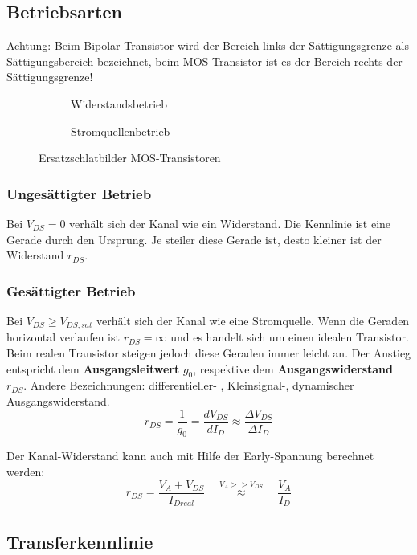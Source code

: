 \subsection{Betriebsarten}
Achtung: Beim Bipolar Transistor wird der Bereich links der Sättigungsgrenze als Sättigungsbereich bezeichnet, beim MOS-Transistor ist es der Bereich
rechts der Sättigungsgrenze!

\begin{figure}[h]
	\centering
	\begin{subfigure}[b]{6cm}
		\centering
		\caption{Widerstandsbetrieb}
	\end{subfigure} \qquad\qquad
	\begin{subfigure}[b]{7cm}
		\centering
		\caption{Stromquellenbetrieb}
	\end{subfigure}
	\caption{Ersatzschlatbilder MOS-Transistoren}
\end{figure}

\subsubsection{Ungesättigter Betrieb}
Bei $V_{DS} = 0$ verhält sich der Kanal wie ein Widerstand. Die Kennlinie ist eine Gerade durch den Ursprung. Je steiler diese Gerade ist, desto
kleiner ist der Widerstand $r_{DS}$.

\subsubsection{Gesättigter Betrieb}
Bei $V_{DS} \geq V_{DS,sat}$ verhält sich der Kanal wie eine Stromquelle. Wenn die Geraden horizontal verlaufen ist $r_{DS} = \infty$ und
es handelt sich um einen idealen Transistor. Beim realen Transistor steigen jedoch diese Geraden immer leicht an.
Der Anstieg entspricht dem \textbf{Ausgangsleitwert} $g_0$, respektive dem \textbf{Ausgangswiderstand} $r_{DS}$.
Andere Bezeichnungen: differentieller- , Kleinsignal-, dynamischer Ausgangswiderstand.
\[
	r_{DS} = \frac{1}{g_0} = \frac{dV_{DS}}{dI_{D}} \approx \frac{\Delta V_{DS}}{\Delta I_D}
\]

Der Kanal-Widerstand kann auch mit Hilfe der Early-Spannung berechnet werden:
\[
	r_{DS} = \frac{V_A + V_{DS}}{I_{Dreal}} \quad \stackrel{V_A >> V_{DS}}{\approx} \quad \frac{V_A}{I_D}
\]

\subsection{Transferkennlinie}


